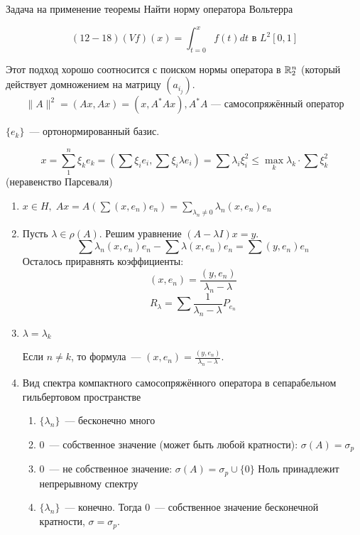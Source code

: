 
\begin{example}
    Задача на применение теоремы 
    Найти норму оператора Вольтерра 

    \[
    (12-18) (V f)(x) = \int_{t = 0}^x f(t) dt \text{ в } L^2[0, 1]
    \]

\end{example}

Этот подход хорошо соотносится с поиском нормы оператора в $\mathbb{R}_2^n$ (который действует домножением на матрицу $(a_{i_j})$.
\[
\|A\|^2 = (Ax, Ax) = (x, A^*Ax), A^*A  \text{~--- самосопряжённый оператор}
\]

$\{e_k\}$~--- ортонормированный базис.

\[
x = \sum_1^n \xi_k e_k = (\sum \xi_i e_i, \sum \xi_i \lambda e_i) = 
\sum \lambda_i \xi_i^2 \leqslant \max_k \lambda_k \cdot \sum \xi_k^2
\]
(неравенство Парсеваля)

\begin{corollary}
    \begin{enumerate}
        \item $x \in H, \; Ax=A(\sum (x, e_n)e_n)=\sum_{\lambda_n \neq 0} \lambda_n (x, e_n) e_n$
        \item Пусть $\lambda \in \rho(A)$. Решим уравнение $(A - \lambda I)x = y$.
        \[
        \sum \lambda_n (x, e_n) e_n - 
        \sum \lambda (x, e_n) e_n = 
        \sum (y, e_n) e_n
        \]
        Осталось приравнять коэффициенты:
        \[
        (x, e_n) = \frac{(y, e_n)}{\lambda_n - \lambda}
        \]
        \[ R_\lambda = \sum \frac{1}{\lambda_n - \lambda} P_{e_n}\]
        \item $\lambda = \lambda_k$

        Если $n \neq k$, то формула~--- $(x, e_n) = 
        \frac{(y, e_n)}{\lambda_n - \lambda}$.
        \item Вид спектра компактного самосопряжённого оператора в сепарабельном гильбертовом пространстве

        \begin{enumerate}
            \item[1] $\{\lambda_n\}$~--- бесконечно много
            \item[1.a] $0$~--- собственное значение (может быть любой кратности): $\sigma(A)=\sigma_p$
            \item[1.b] $0$~--- не собственное значение: $\sigma(A)=\sigma_p \cup \{0\}$
            Ноль принадлежит непрерывному спектру
            \item[2] $\{\lambda_n\}$~--- конечно.
            Тогда 0~--- собственное значение бесконечной кратности, $\sigma = \sigma_p$.
        \end{enumerate}
    \end{enumerate}
\end{corollary}

